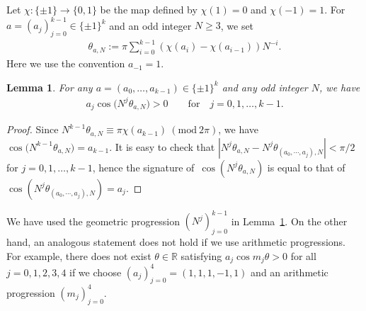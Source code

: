\documentclass[10pt,a4paper]{amsart}
\numberwithin{equation}{section}
\newtheorem{Lemma}[Theorem]{Lemma}
\begin{document}
Let $\chi\colon\{\pm 1\} \rightarrow \{0,1\}$ be
the map defined by $\chi(1) = 0$ and $\chi(-1) = 1$.
For $a = (a_j)_{j=0}^{k-1} \in \{\pm1\}^{k}$ and an odd integer $N\geq 3$,
we set
\begin{align*}%
\theta_{a,N} := \pi\sum_{i=0}^{k-1} (\chi(a_i) - \chi(a_{i-1}))N^{-i}.
\end{align*}
Here we use the convention $a_{-1}=1$.
\begin{Lemma}\label{sekoi}
For any $a=(a_{0},\ldots,a_{k-1})\in \{\pm1\}^{k}$ and any odd integer $N$,
we have
\begin{gather*}
a_j\cos\big(N^{j}\theta_{a,N}\big) > 0 \qquad \text{for}\quad j=0,1,\ldots,k-1.
\end{gather*}
\end{Lemma}

\begin{proof}
Since
$N^{k-1}\theta_{a,N} \equiv \pi \chi(a_{k-1}) \ (\mathrm{mod}\ 2\pi)$,
we have $\cos \big(N^{k-1} \theta_{a,N}\big) = a_{k-1}$.
It is easy to check that
$|N^{j} \theta_{a,N} - N^{j} \theta_{(a_0,\cdots,a_j),N}| < \pi/2$ for $j=0,1,\ldots,k-1$,
hence the signature of~$\cos (N^{j} \theta_{a,N})$ is equal to that of
$\cos (N^{j} \theta_{(a_0,\cdots,a_j),N}) = a_j$.
\end{proof}

\begin{Remark}
We have used the geometric progression $(N^{j})_{j=0}^{k-1}$ in Lemma~\ref{sekoi}.
On the other hand, an analogous statement does not hold if
we use arithmetic progressions. For example,
there does not exist $\theta \in \mathbb{R}$
satisfying $a_j\cos m_j\theta > 0$ for all $j=0,1,2,3,4$
if we choose $(a_j)_{j=0}^{4}=(1,1,1,-1,1)$ and
an arithmetic progression $(m_j)_{j=0}^{4}$.
\end{Remark}
\end{document}
